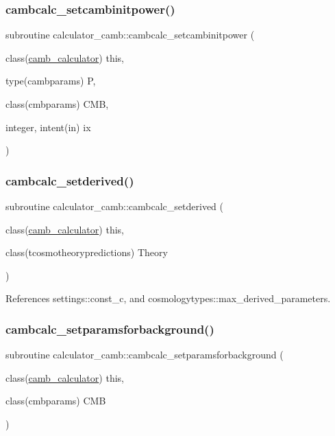 \subsubsection{\texorpdfstring{cambcalc\+\_\+setcambinitpower()}{cambcalc\_setcambinitpower()}}
{\footnotesize\ttfamily subroutine calculator\+\_\+camb\+::cambcalc\+\_\+setcambinitpower (\begin{DoxyParamCaption}\item[{class(\mbox{\hyperlink{structcalculator__camb_1_1camb__calculator}{camb\+\_\+calculator}})}]{this,  }\item[{type(cambparams)}]{P,  }\item[{class(cmbparams)}]{C\+MB,  }\item[{integer, intent(in)}]{ix }\end{DoxyParamCaption})}

\mbox{\label{namespacecalculator__camb_a451eeaadb06191ee0203caf0d76c66c2}} 
\subsubsection{\texorpdfstring{cambcalc\+\_\+setderived()}{cambcalc\_setderived()}}
{\footnotesize\ttfamily subroutine calculator\+\_\+camb\+::cambcalc\+\_\+setderived (\begin{DoxyParamCaption}\item[{class(\mbox{\hyperlink{structcalculator__camb_1_1camb__calculator}{camb\+\_\+calculator}})}]{this,  }\item[{class(tcosmotheorypredictions)}]{Theory }\end{DoxyParamCaption})}



References settings\+::const\+\_\+c, and cosmologytypes\+::max\+\_\+derived\+\_\+parameters.

\mbox{\label{namespacecalculator__camb_a2f68d8cedf36c519d822547aa49c3f98}} 
\subsubsection{\texorpdfstring{cambcalc\+\_\+setparamsforbackground()}{cambcalc\_setparamsforbackground()}}
{\footnotesize\ttfamily subroutine calculator\+\_\+camb\+::cambcalc\+\_\+setparamsforbackground (\begin{DoxyParamCaption}\item[{class(\mbox{\hyperlink{structcalculator__camb_1_1camb__calculator}{camb\+\_\+calculator}})}]{this,  }\item[{class(cmbparams)}]{C\+MB }\end{DoxyParamCaption})\hspace{0.3cm}{\ttfamily [private]}}

